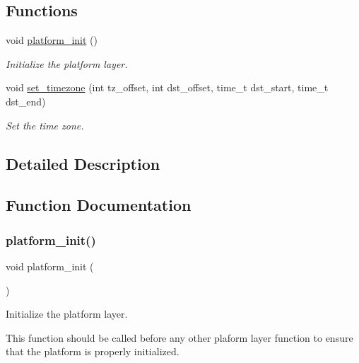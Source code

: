 \subsection*{Functions}
\begin{DoxyCompactItemize}
\item 
void \hyperlink{group__platform_ga390c450e83ddc7807da2e9f0a894d8d1}{platform\+\_\+init} ()
\begin{DoxyCompactList}\small\item\em Initialize the platform layer. \end{DoxyCompactList}\item 
void \hyperlink{group__platform_ga7daa4503916928a2d93ded5c924f57d5}{set\+\_\+timezone} (int tz\+\_\+offset, int dst\+\_\+offset, time\+\_\+t dst\+\_\+start, time\+\_\+t dst\+\_\+end)
\begin{DoxyCompactList}\small\item\em Set the time zone. \end{DoxyCompactList}\end{DoxyCompactItemize}


\subsection{Detailed Description}


\subsection{Function Documentation}
\mbox{\label{group__platform_ga390c450e83ddc7807da2e9f0a894d8d1}} 
\subsubsection{\texorpdfstring{platform\+\_\+init()}{platform\_init()}}
{\footnotesize\ttfamily void platform\+\_\+init (\begin{DoxyParamCaption}{ }\end{DoxyParamCaption})}



Initialize the platform layer. 

This function should be called before any other plaform layer function to ensure that the platform is properly initialized. \mbox{\label{group__platform_ga7daa4503916928a2d93ded5c924f57d5}} 
